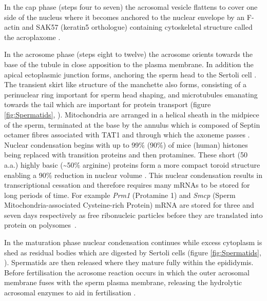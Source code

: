 In the cap phase (steps four to seven) the acrosomal vesicle flattens to cover one side of the nucleus where it becomes anchored to the nuclear envelope by an F-actin and SAK57 (keratin5 orthologue) containing cytoskeletal structure called the acroplaxome \parencite{Kierszenbaum2003Acroplaxome, Kierszenbaum2004acrosomeacroplaxomemanchette}.

In the acrosome phase (steps eight to twelve) the acrosome orients towards the base of the tubule in close apposition to the plasma membrane.
In addition the apical ectoplasmic junction forms, anchoring the sperm head to the Sertoli cell \parencite{Wong2008Biology}.
The transient skirt like structure of the manchette also forms, consisting of a perinuclear ring important for sperm head shaping, and microtubules emanating towards the tail which are important for protein transport (figure \ref{fig:Spermatids}, \cite{Lehti2016Formation}).
Mitochondria are arranged in a helical sheath in the midpiece of the sperm, terminated at the base by the annulus which is composed of Septin octamer fibres associated with TAT1 and through which the axoneme passes \parencite{Ho2007Three, Toure2011Septins, Kuo2015SEPT12}.
Nuclear condensation begins with up to 99\% (90\%) of mice (human) histones being replaced with transition proteins and then protamines.
These short (50 a.a.) highly basic (\textasciitilde50\% arginine) proteins form a more compact toroid structure enabling a 90\% reduction in nuclear volume \parencite{Balhorn2007protamine, Ward2010Function, Yamaguchi2018Reevaluating}.
This nuclear condensation results in transcriptional cessation and therefore requires many mRNAs to be stored for long periods of time.
For example \textit{Prm1} (Protamine 1) and \textit{Smcp} (Sperm Mitochondria-associated Cysteine-rich Protein) mRNA are stored for three and seven days respectively as free ribonucleic particles before they are translated into protein on polysomes~\parencite{Cullinane2015Mechanisms, Kleene1984Translational, Kleene2004Patterns}.

In the maturation phase nuclear condensation continues while excess cytoplasm is shed as residual bodies which are digested by Sertoli cells (figure \ref{fig:Spermatids}, \cite{Lacy1962CERTAIN, Breucker1985Morphogenesis, Hermo2010Surfing}).
Spermatids are then released where they mature fully within the epididymis.
Before fertilisation the acrosome reaction occurs in which the outer acrosomal membrane fuses with the sperm plasma membrane, releasing the hydrolytic acrosomal enzymes to aid in fertilisation \parencite{Jin2011Most}.







